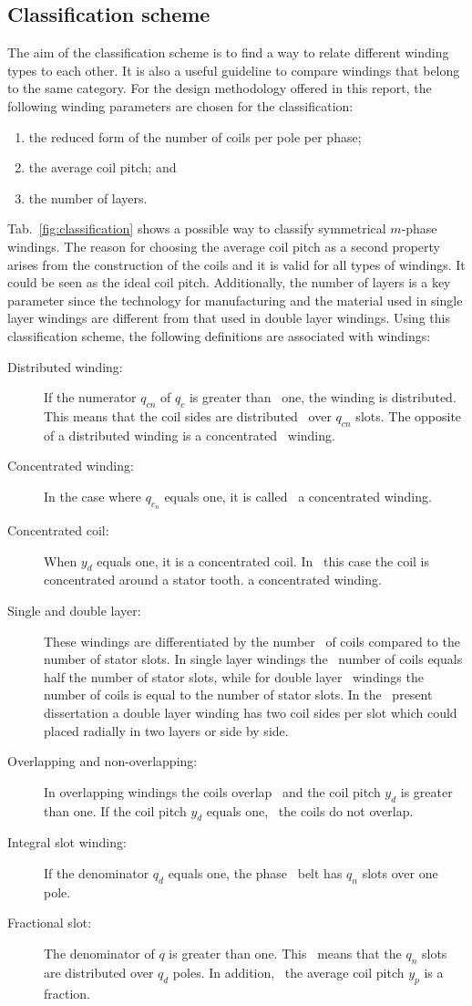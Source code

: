 \subsection{Classification scheme}
The aim of the classification scheme is to find a way to relate different winding types to each other. It is also a useful guideline to compare windings that belong to the same category. For the design methodology offered in this report, the following winding parameters are chosen for the classification:
\begin{enumerate}
  \item the reduced form of the number of coils per pole per phase;
  \item the average coil pitch; and 
  \item the number of layers.
\end{enumerate}
Tab.~\ref{fig:classification} shows a possible way to classify symmetrical $m$-phase windings. The reason for choosing the average coil pitch as a second property arises from the construction of the coils and it is valid for all types of windings. It could be seen as the ideal coil pitch. Additionally, the number of layers is a key parameter since the technology for manufacturing and the material used in single layer windings are different from that used in double layer windings. Using this classification scheme, the following definitions are associated with windings:
\begin{description}
  \item[Distributed winding:] If the numerator $q_{cn}$ of $q_c$ is greater than~%
  one, the winding is distributed. This means that the coil sides are distributed~%
  over $q_{cn}$ slots. The opposite of a distributed winding is a concentrated~%
  winding.
  \item[Concentrated winding:] In the case where $q_{c_n}$ equals one, it is called~%
  a concentrated winding. 
  \item[Concentrated coil:] When $y_d$ equals one, it is a concentrated coil. In~%
  this case the coil is concentrated around a stator tooth.
  a concentrated winding. 
  \item[Single and double layer:] These windings are differentiated by the number~%
  of coils compared to the number of stator slots. In single layer windings the~%
  number of coils equals half the number of stator slots, while for double layer~%
  windings the number of coils is equal to the number of stator slots. In the~%
  present dissertation a double layer winding has two coil sides per slot which could~%
  placed radially in two layers or side by side. 
  \item[Overlapping and non-overlapping:] In overlapping windings the coils overlap~%
  and the coil pitch $y_d$ is greater than one. If the coil pitch $y_d$ equals one,~%
  the coils do not overlap.
  \item[Integral slot winding:] If the denominator $q_d$ equals one, the phase~%
  belt has $q_n$ slots over one pole.
  \item[Fractional slot:] The denominator of $q$ is greater than one. This~%
  means that the $q_n$ slots are distributed over $q_d$ poles. In addition,~%
  the average coil pitch $y_p$ is a fraction. 
\end{description}
